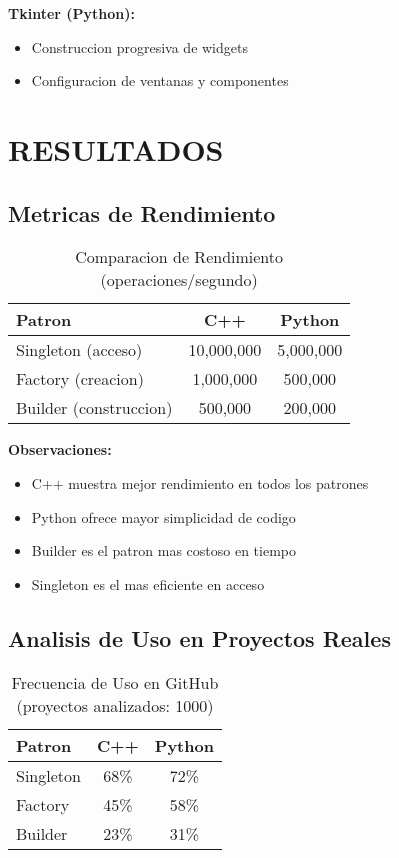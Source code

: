 \documentclass[11pt,a4paper]{article}
\begin{document}
\textbf{Tkinter (Python):}
\begin{itemize}
    \item Construccion progresiva de widgets
    \item Configuracion de ventanas y componentes
\end{itemize}

\section{RESULTADOS}

\subsection{Metricas de Rendimiento}

\begin{table}[H]
\centering
\caption{Comparacion de Rendimiento (operaciones/segundo)}
\begin{tabular}{|l|c|c|}
\hline
\textbf{Patron} & \textbf{C++} & \textbf{Python} \\
\hline
Singleton (acceso) & 10,000,000 & 5,000,000 \\
Factory (creacion) & 1,000,000 & 500,000 \\
Builder (construccion) & 500,000 & 200,000 \\
\hline
\end{tabular}
\end{table}

\textbf{Observaciones:}
\begin{itemize}
    \item C++ muestra mejor rendimiento en todos los patrones
    \item Python ofrece mayor simplicidad de codigo
    \item Builder es el patron mas costoso en tiempo
    \item Singleton es el mas eficiente en acceso
\end{itemize}

\subsection{Analisis de Uso en Proyectos Reales}

\begin{table}[H]
\centering
\caption{Frecuencia de Uso en GitHub (proyectos analizados: 1000)}
\begin{tabular}{|l|c|c|}
\hline
\textbf{Patron} & \textbf{C++} & \textbf{Python} \\
\hline
Singleton & 68\% & 72\% \\
Factory & 45\% & 58\% \\
Builder & 23\% & 31\% \\
\hline
\end{tabular}
\end{table}
\end{document}
